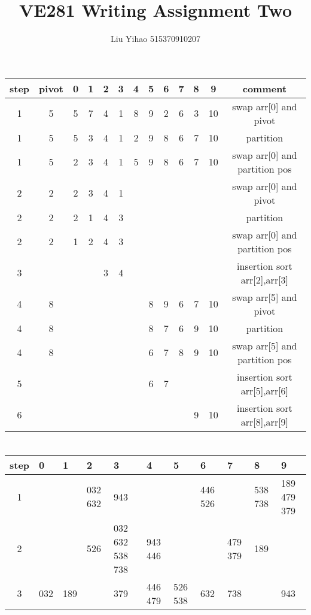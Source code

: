 \documentclass{article}
\title{VE281 Writing Assignment Two}
\author{Liu Yihao 515370910207}
\date{}
\begin{document}
\maketitle

\section{}
\begin{center}
\begin{tabular}{|c|c|c|c|c|c|c|c|c|c|c|c|c|}
\hline
step & pivot & 0 & 1 & 2 & 3 & 4 & 5 & 6 & 7 & 8 & 9 & comment \\\hline
1 & 5 & 5 & 7 & 4 & 1 & 8 & 9 & 2 & 6 & 3 & 10 & swap arr[0] and pivot \\\hline
1 & 5 & 5 & 3 & 4 & 1 & 2 & 9 & 8 & 6 & 7 & 10 & partition \\\hline
1 & 5 & 2 & 3 & 4 & 1 & 5 & 9 & 8 & 6 & 7 & 10 & swap arr[0] and partition pos \\\hline
2 & 2 & 2 & 3 & 4 & 1 &&&&&&& swap arr[0] and pivot \\\hline
2 & 2 & 2 & 1 & 4 & 3 &&&&&&& partition \\\hline
2 & 2 & 1 & 2 & 4 & 3 &&&&&&& swap arr[0] and partition pos \\\hline
3 &   &   &   & 3 & 4 &&&&&&& insertion sort arr[2],arr[3] \\\hline
4 & 8 &&&&&& 8 & 9 & 6 & 7 & 10 & swap arr[5] and pivot\\\hline
4 & 8 &&&&&& 8 & 7 & 6 & 9 & 10 & partition \\\hline
4 & 8 &&&&&& 6 & 7 & 8 & 9 & 10 & swap arr[5] and partition pos \\\hline
5 &   &&&&&& 6 & 7 &   &   &    & insertion sort arr[5],arr[6] \\\hline
6 &   &&&&&&   &   &   & 9 & 10 & insertion sort arr[8],arr[9] \\\hline
\end{tabular}
\end{center}

\section{}
\begin{center}
\begin{tabular}{|c|m{2em}<{\centering}|m{2em}<{\centering}|m{2em}<{\centering}|m{2em}<{\centering}|m{2em}<{\centering}|m{2em}<{\centering}|m{2em}<{\centering}|m{2em}<{\centering}|m{2em}<{\centering}|m{2em}<{\centering}|}
\hline
step & 0 & 1 & 2 & 3 & 4 & 5 & 6 & 7 & 8 & 9 \\\hline
1 & & & 032 632 & 943 & & & 446 526 & & 538 738 & 189 479 379 \\\hline 
2 & & & 526 & 032 632 538 738 & 943 446 & & & 479 379 & 189 & \\\hline
3 & 032 & 189 & & 379 & 446 479 & 526 538 & 632 & 738 & & 943\\\hline
\end{tabular}
\end{center}
\end{document}
